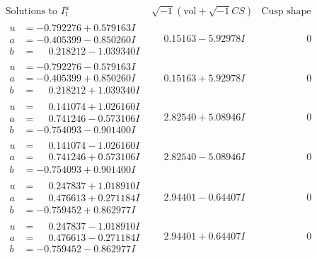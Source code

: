 \documentclass[1p]{elsarticle_modified}
\theoremstyle{definition}
\newcommand{\I}{\sqrt{-1}}
\begin{document}
$$\begin{array}{c|c|c}  
\text{Solutions to }I^u_{1}& \I (\text{vol} + \sqrt{-1}CS) & \text{Cusp shape}\\
 \hline 
\begin{aligned}
u &= -0.792276 + 0.579163 I \\
a &= -0.405399 - 0.850260 I \\
b &= \phantom{-}0.218212 - 1.039340 I\end{aligned}
 & \phantom{-}0.15163 - 5.92978 I & \phantom{-0.000000 } 0 \\ \hline\begin{aligned}
u &= -0.792276 - 0.579163 I \\
a &= -0.405399 + 0.850260 I \\
b &= \phantom{-}0.218212 + 1.039340 I\end{aligned}
 & \phantom{-}0.15163 + 5.92978 I & \phantom{-0.000000 } 0 \\ \hline\begin{aligned}
u &= \phantom{-}0.141074 + 1.026160 I \\
a &= \phantom{-}0.741246 - 0.573106 I \\
b &= -0.754093 - 0.901400 I\end{aligned}
 & \phantom{-}2.82540 + 5.08946 I & \phantom{-0.000000 } 0 \\ \hline\begin{aligned}
u &= \phantom{-}0.141074 - 1.026160 I \\
a &= \phantom{-}0.741246 + 0.573106 I \\
b &= -0.754093 + 0.901400 I\end{aligned}
 & \phantom{-}2.82540 - 5.08946 I & \phantom{-0.000000 } 0 \\ \hline\begin{aligned}
u &= \phantom{-}0.247837 + 1.018910 I \\
a &= \phantom{-}0.476613 + 0.271184 I \\
b &= -0.759452 + 0.862977 I\end{aligned}
 & \phantom{-}2.94401 - 0.64407 I & \phantom{-0.000000 } 0 \\ \hline\begin{aligned}
u &= \phantom{-}0.247837 - 1.018910 I \\
a &= \phantom{-}0.476613 - 0.271184 I \\
b &= -0.759452 - 0.862977 I\end{aligned}
 & \phantom{-}2.94401 + 0.64407 I & \phantom{-0.000000 } 0 \\ \hline\begin{aligned}

\end{aligned}
\end{array}$$
\end{document}
